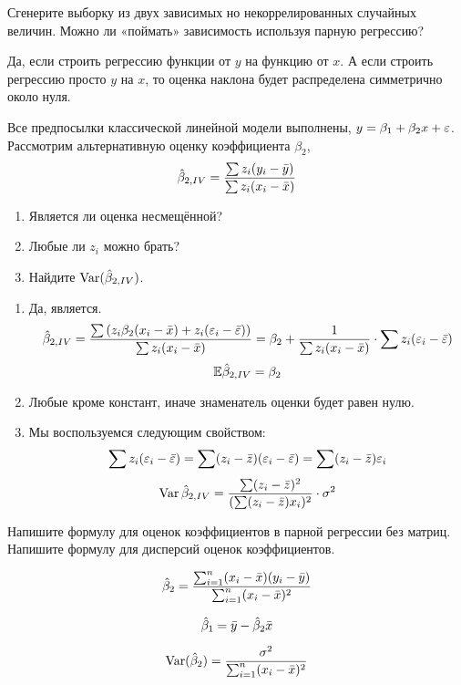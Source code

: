 \begin{problem}
Сгенерите выборку из двух зависимых но некоррелированных случайных величин. Можно ли «поймать» зависимость используя парную регрессию?


\begin{sol}
Да, если строить регрессию функции от $y$ на функцию от $x$. А если строить регрессию просто $y$ на $x$, то оценка наклона будет распределена симметрично около нуля.
\end{sol}
\end{problem}



\begin{problem}
Все предпосылки классической линейной модели выполнены, $y=\beta_1+\beta_2 x+\varepsilon$. Рассмотрим альтернативную оценку коэффициента $\beta_2$,
\[
\hat{\beta}_{2,IV}=\frac{\sum z_i(y_i-\bar{y})}{\sum z_i(x_i-\bar{x})}
\]
\begin{enumerate}
\item Является ли оценка несмещённой?
\item Любые ли $z_i$ можно брать?
\item Найдите $\operatorname{Var}(\hat{\beta}_{2,IV})$.
\end{enumerate}


\begin{sol}
\begin{enumerate}
\item Да, является.
\[\hat{\beta}_{2,IV} = \frac{\sum \left(z_i \beta_2 (x_i - \bar{x}) + z_i (\varepsilon_i - \bar{\varepsilon}) \right)}{\sum z_i  (x_i - \bar{x})} = \beta_2 + \frac{1}{\sum z_i  (x_i - \bar{x})} \cdot \sum z_i (\varepsilon_i - \bar{\varepsilon})  \]
\[\mathbb{E} \hat{\beta}_{2,IV} = \beta_2\]
\item Любые кроме констант, иначе знаменатель оценки будет равен нулю.
\item Мы воспользуемся следующим свойством:
\[ \sum z_i (\varepsilon_i - \bar{\varepsilon}) = \sum (z_i - \bar{z}) (\varepsilon_i - \bar{\varepsilon}) = \sum (z_i - \bar{z}) \varepsilon_i  \]
\[\operatorname{Var} \hat{\beta}_{2,IV} = \frac{\sum (z_i - \bar{z})^2}{(\sum (z_i - \bar{z})x_i)^2} \cdot \sigma^2 \]
\end{enumerate}

\end{sol}
\end{problem}


\begin{problem}
Напишите формулу для оценок коэффициентов в парной регрессии без матриц. Напишите формулу для дисперсий оценок коэффициентов.
\begin{sol}
\[
\hat{\beta}_2 = \frac{\sum_{i=1}^n (x_i - \bar x)(y_i - \bar y)}{\sum_{i=1}^n (x_i - \bar x)^2}
\]

\[
\hat{\beta}_1 = \bar y - \hat{\beta}_2 \bar x
\]

\[
\operatorname{Var}(\hat{\beta}_2) = \frac{\sigma^2}{\sum_{i=1}^n (x_i - \bar x)^2}
\]
\end{sol}
\end{problem}



